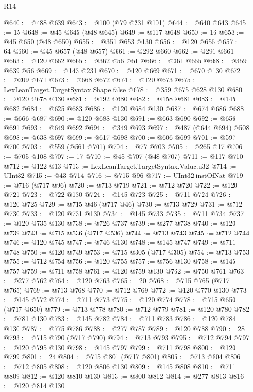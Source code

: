 \begin{lexlean}{R14}
\begin{coremodule}
{{{{{{{{{{{{{{{{{{{{{{{{{{{{{{{{{{{{{{{{{{{{{{{{{{{{{{{{{{{{{{{{{{{{{{{{{{{{{{{{{{{{{{{{{{{{{{{{{{{{{{{{{{@640 := @488 @639
@643 := @100 (@79 @231 @101)
@644 := @640 @643
@645 := 15
@648 := @45 @645 (@48 @645)
@649 := @117 @648
@650 := 16
@653 := @45 @650 (@48 @650)
@655 := @351 @653 @130
@656 := @120 @655
@657 := 64
@660 := @45 @657 (@48 @657)
@661 := @292 @660
@662 := @291 @661
@663 := @120 @662
@665 := @362 @56 @51
@666 := @361 @665
@668 := @359 @639 @56
@669 := @143 @231
@670 := @120 @669
@671 := @670 @130
@672 := @209 @671
@673 := @668 @672
@674 := @120 @673
@675 := LexLeanTarget.TargetSyntax.Shape.false
@678 := @359 @675 @628 @130
@680 := @120 @678 @130
@681 := @192 @680
@682 := @158 @681
@683 := @145 @682
@684 := @625 @683
@686 := @120 @684 @130
@687 := @674 @686
@688 := @666 @687
@690 := @120 @688 @130
@691 := @663 @690
@692 := @656 @691
@693 := @649 @692
@694 := @349 @693
@697 := @487 (@644 @694) @508
@698 := @638 @697
@699 := @617 @698
@700 := @606 @699
@701 := @597 @700
@703 := @559 (@561 @701)
@704 := @77 @703
@705 := @265 @17
@706 := @705 @108
@707 := 17
@710 := @45 @707 (@48 @707)
@711 := @117 @710
@712 := @122 @13
@713 := LexLeanTarget.TargetSyntax.Value.u32
@714 := UInt32
@715 := @43 @714
@716 := @715 @96
@717 := UInt32.instOfNat
@719 := @716 (@717 @96)
@720 := @713 @719
@721 := @712 @720
@722 := @120 @721
@723 := @722 @130
@724 := @145 @723
@725 := @711 @724
@726 := @120 @725
@729 := @715 @46 (@717 @46)
@730 := @713 @729
@731 := @712 @730
@733 := @120 @731 @130
@734 := @145 @733
@735 := @711 @734
@737 := @120 @735 @130
@738 := @726 @737
@739 := @277 @738
@740 := @120 @739
@743 := @715 @536 (@717 @536)
@744 := @713 @743
@745 := @712 @744
@746 := @120 @745
@747 := @746 @130
@748 := @145 @747
@749 := @711 @748
@750 := @120 @749
@753 := @715 @305 (@717 @305)
@754 := @713 @753
@755 := @712 @754
@756 := @120 @755
@757 := @756 @130
@758 := @145 @757
@759 := @711 @758
@761 := @120 @759 @130
@762 := @750 @761
@763 := @277 @762
@764 := @120 @763
@765 := 20
@768 := @715 @765 (@717 @765)
@769 := @713 @768
@770 := @712 @769
@772 := @120 @770 @130
@773 := @145 @772
@774 := @711 @773
@775 := @120 @774
@778 := @715 @650 (@717 @650)
@779 := @713 @778
@780 := @712 @779
@781 := @120 @780
@782 := @781 @130
@783 := @145 @782
@784 := @711 @783
@786 := @120 @784 @130
@787 := @775 @786
@788 := @277 @787
@789 := @120 @788
@790 := 28
@793 := @715 @790 (@717 @790)
@794 := @713 @793
@795 := @712 @794
@797 := @120 @795 @130
@798 := @145 @797
@799 := @711 @798
@800 := @120 @799
@801 := 24
@804 := @715 @801 (@717 @801)
@805 := @713 @804
@806 := @712 @805
@808 := @120 @806 @130
@809 := @145 @808
@810 := @711 @809
@812 := @120 @810 @130
@813 := @800 @812
@814 := @277 @813
@816 := @120 @814 @130
}}}}}}}}}}}}}}}}}}}}}}}}}}}}}}}}}}}}}}}}}}}}}}}}}}}}}}}}}}}}}}}}}}}}}}}}}}}}}}}}}}}}}}}}}}}}}}}}}}}}}}}}}}
\end{coremodule}
\end{lexlean}
